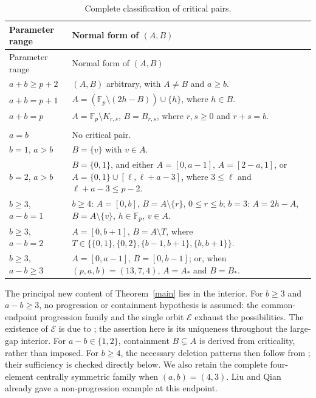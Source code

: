 \documentclass[10pt,a4paper]{amsart}
\newcommand{\F}{\mathbb{F}_p}
\begin{document}
\begingroup
\renewcommand{\arraystretch}{1.08}
\begin{longtable}{@{}>{\raggedright\arraybackslash}p{}>{\raggedright\arraybackslash}p{}@{}}
\caption{Complete classification of critical pairs.}
\label{total}\\
\toprule
\textnormal{Parameter range}&\textnormal{Normal form of $(A,B)$}\\
\midrule
\endfirsthead
\toprule
\textnormal{Parameter range}&\textnormal{Normal form of $(A,B)$}\\
\midrule
\endhead
$a+b\ge p+2$&$(A,B)$ arbitrary, with $A\ne B$ and $a\ge b$.\\[3pt]
$a+b=p+1$&$A=(\F\setminus(2h-B))\cup\{h\}$, where $h\in B$.\\[3pt]
$a+b=p$&$A=\F\setminus K_{r,s}$, $B=B_{r,s}$, where $r,s\ge0$ and $r+s=b$.\\
\midrule
\multicolumn{2}{@{}l}{\emph{Interior range $a+b\le p-1$:}}\\[2pt]
$a=b$&No critical pair.\\[3pt]
$b=1$, $a>b$&$B=\{v\}$ with $v\in A$.\\[4pt]
$b=2$, $a>b$&$B=\{0,1\}$, and either\newline
$A=[0,a-1]$, $A=[2-a,1]$, or\newline
$A=\{0,1\}\cup[\ell,\ell+a-3]$, where $3\le\ell$ and $\ell+a-3\le p-2$.\\[4pt]
$b\ge3$, $a-b=1$&$b\ge4$: $A=[0,b]$, $B=A\setminus\{r\}$, $0\le r\le b$;\newline
$b=3$: $A=2h-A$, $B=A\setminus\{v\}$, $h\in\F$, $v\in A$.\\[4pt]
$b\ge3$, $a-b=2$&$A=[0,b+1]$, $B=A\setminus T$, where\newline
$T\in\bigl\{\{0,1\},\{0,2\},\{b-1,b+1\},\{b,b+1\}\bigr\}$.\\[4pt]
$b\ge3$, $a-b\ge3$&$A=[0,a-1]$, $B=[0,b-1]$;\newline
or, when $(p,a,b)=(13,7,4)$, $A=A_*$ and $B=B_*$.\\
\bottomrule
\end{longtable}
\endgroup

The principal new content of Theorem~\ref{main} lies in the interior.
For $b\ge3$ and $a-b\ge3$, no progression or containment hypothesis is
assumed: the common-endpoint progression family and the single orbit
$\mathcal E$ exhaust the possibilities.  The existence of $\mathcal E$
is due to \cite[Example 4.1]{HLY}; the assertion here is its uniqueness
throughout the large-gap interior.  For $a-b\in\{1,2\}$, containment
$B\subsetneq A$ is derived from criticality, rather than imposed.
For $b\ge4$, the necessary deletion patterns then follow from
\cite[Proposition 3.4]{LQ}; their sufficiency is checked directly below.
We also retain the complete four-element centrally symmetric family
when $(a,b)=(4,3)$.  Liu and Qian \cite[Remark 3.5]{LQ} already gave
a non-progression example at this endpoint.
\end{document}
